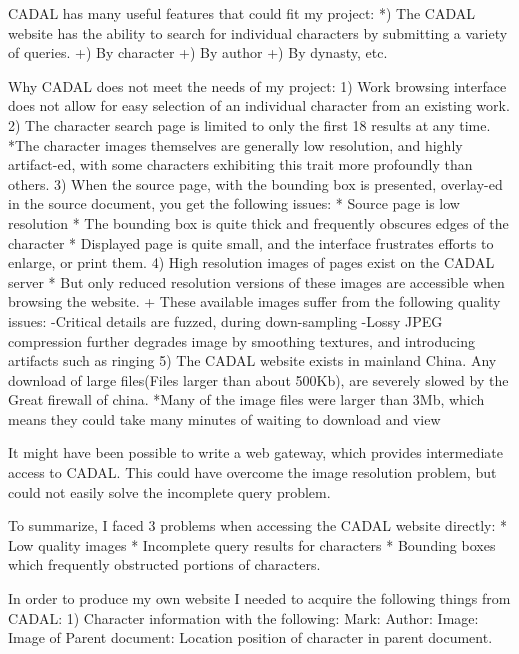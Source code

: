     CADAL has many useful features that could fit my project:
        *)  The CADAL website has the ability to search for individual characters by submitting a variety of queries.
            +)  By character
            +)  By author
            +)  By dynasty, etc.


    Why CADAL does not meet the needs of my project:
        1)  Work browsing interface does not allow for easy selection of an individual character from an existing work.
        2)  The character search page is limited to only the first 18 results at any time.
            *The character images themselves are generally low resolution, and highly artifact-ed, with some characters exhibiting this trait more profoundly than others.
        3)  When the source page, with the bounding box is presented, overlay-ed in the source document, you get the following issues:
            *  Source page is low resolution
            *  The bounding box is quite thick and frequently obscures edges of the character
            *  Displayed page is quite small, and the interface frustrates efforts to enlarge, or print them.
        4)  High resolution images of pages exist on the CADAL server
            * But only reduced resolution versions of these images are accessible when browsing the website.
                + These available images suffer from the following quality issues:
                    -Critical details are fuzzed, during down-sampling
                    -Lossy JPEG compression further degrades image by smoothing textures, and introducing artifacts such as ringing
        5)  The CADAL website exists in mainland China.  Any download of large files(Files larger than about 500Kb), are severely slowed by the Great firewall of china.
            *Many of the image files were larger than 3Mb, which means they could take many minutes of waiting to download and view
        
        
    It might have been possible to write a web gateway, which provides intermediate access to CADAL.  This could have overcome the image resolution problem, but could not easily solve the incomplete query problem.
    
    To summarize, I faced 3 problems when accessing the CADAL website directly:
        *  Low quality images
        *  Incomplete query results for characters
        *  Bounding boxes which frequently obstructed portions of characters.
                    



    In order to produce my own website I needed to acquire the following things from CADAL:
        1)  Character information with the following:
            Mark:
            Author:
            Image:
            Image of Parent document:
            Location position of character in parent document.
        
